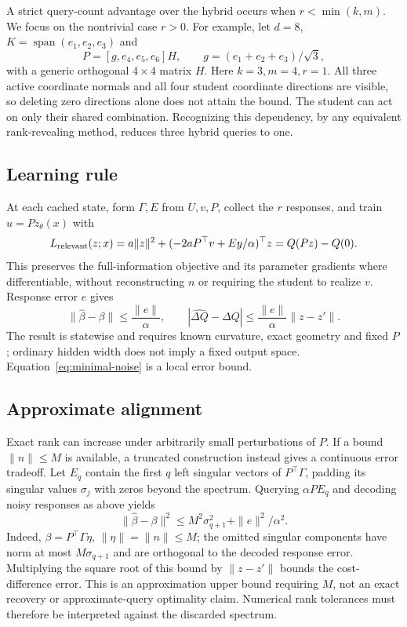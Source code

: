 A strict query-count advantage over the hybrid occurs when $r<\min(k,m)$.
We focus on the nontrivial case $r>0$. For example,
let $d=8$, $K=\operatorname{span}(e_1,e_2,e_3)$ and
\begin{equation}\label{eq:shared-actuation}
 P=[g,e_4,e_5,e_6]H,\qquad
 g=(e_1+e_2+e_3)/\sqrt3,
\end{equation}
with a generic orthogonal $4\times4$ matrix $H$. Here $k=3,m=4,r=1$.
All three active coordinate normals and all four student coordinate
directions are visible, so deleting zero directions alone does not
attain the bound. The student can act on only their shared combination.
Recognizing this dependency, by any equivalent rank-revealing method,
reduces three hybrid queries to one.

\subsection{Learning rule}
At each cached state, form $\Gamma,E$ from $U,v,P$, collect the
$r$ responses, and train $u=Pz_\theta(x)$ with
\begin{equation}\label{eq:minimal-loss}
 L_{\rm relevant}(z;x)=a\|z\|^2+
          (-2aP^\top v+Ey/\alpha)^\top z=Q(Pz)-Q(0).
\end{equation}
This preserves the full-information objective and its parameter
gradients where differentiable, without reconstructing $n$ or
requiring the student to realize $v$. Response error $e$ gives
\begin{equation}\label{eq:minimal-noise}
 \|\widehat\beta-\beta\|\leq\frac{\|e\|}{\alpha},\qquad
 |\widehat{\Delta Q}-\Delta Q|
 \leq\frac{\|e\|}{\alpha}\|z-z'\|.
\end{equation}
The result is statewise and requires known curvature, exact geometry
and fixed $P$; ordinary hidden width does not imply a fixed output
space. Equation~\eqref{eq:minimal-noise} is a local error bound.

\subsection{Approximate alignment}
Exact rank can increase under arbitrarily small perturbations of $P$.
If a bound $\|n\|\leq M$ is available, a truncated construction instead
gives a continuous error tradeoff. Let $E_q$ contain the first $q$ left
singular vectors of $P^\top\Gamma$, padding its singular values $\sigma_j$
with zeros beyond the spectrum.
Querying $\alpha PE_q$ and decoding noisy responses as above yields
\begin{equation}\label{eq:truncated-feedback}
 \|\widehat\beta-\beta\|^2\leq
 M^2\sigma_{q+1}^2+\|e\|^2/\alpha^2.
\end{equation}
Indeed, $\beta=P^\top\Gamma\eta$, $\|\eta\|=\|n\|\leq M$;
the omitted singular components have norm at most $M\sigma_{q+1}$
and are orthogonal to the decoded response error. Multiplying the
square root of this bound by $\|z-z'\|$ bounds the cost-difference
error. This is an approximation upper bound requiring $M$, not an
exact recovery or approximate-query optimality claim. Numerical rank
tolerances must therefore be interpreted against the discarded spectrum.

